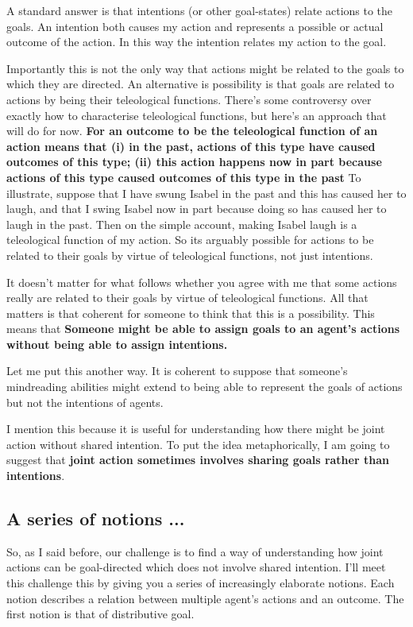 \documentclass[12pt,a4paper]{extarticle}
\begin{document}
A standard answer is that intentions (or other goal-states) relate actions to the goals.
An intention both causes my action and represents a possible or actual outcome of the action.
In this way the intention relates my action to the goal.

Importantly this is not the only way that actions might be related to the goals to which they are directed.
An alternative is possibility is that goals are related to actions by being their teleological functions.
There's some controversy over exactly how to characterise teleological functions, but here's an approach that will do for now.
\textbf{
For an outcome to be the teleological function of an action means that (i) in the past, actions of this type have caused outcomes of this type; (ii) this action happens now in part because actions of this type caused outcomes of this type in the past
}
To illustrate, suppose that I have swung Isabel in the past and this has caused her to laugh, and that I  swing Isabel now in part because doing so has caused her to laugh in the past.
Then on the simple account, making Isabel laugh is a teleological function of my action.
So its arguably possible for actions to be related to their goals by virtue of teleological functions, not just intentions.

It doesn't matter for what follows whether you agree with me that some actions really are related to their goals by virtue of teleological functions.  
All that matters is that coherent for someone to think that this is a possibility.
This means that \textbf{Someone might be able to assign goals to an agent's actions without being able to assign intentions.}

Let me put this another way.
It is coherent to suppose that someone's mindreading abilities might extend to being able to represent the goals of actions but not the intentions of agents.

I mention this because it is useful for understanding how there might be joint action without shared intention.
To put the idea metaphorically, I am going to suggest that \textbf{joint action sometimes involves sharing goals rather than intentions}.




\subsection{A series of notions ...}
So, as I said before, our challenge is to find a way of understanding how joint actions can be goal-directed which does not involve shared intention.
I'll meet this challenge this by giving you a series of increasingly elaborate notions.  
Each notion describes a relation between multiple agent's actions and an outcome.
The first notion is that of distributive goal.
\end{document}
